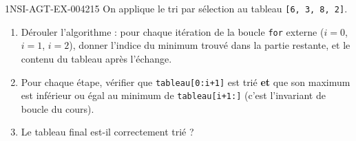 \begin{exercice}{1NSI-AGT-EX-004}{2}{15}
On applique le tri par sélection au tableau \lstinline{[6, 3, 8, 2]}.
\begin{enumerate}
  \item Dérouler l'algorithme : pour chaque itération de la boucle \lstinline{for} externe ($i=0$, $i=1$, $i=2$), donner l'indice du minimum trouvé dans la partie restante, et le contenu du tableau après l'échange.
  \item Pour chaque étape, vérifier que \lstinline{tableau[0:i+1]} est trié \textbf{et} que son maximum est inférieur ou égal au minimum de \lstinline{tableau[i+1:]} (c'est l'invariant de boucle du cours).
  \item Le tableau final est-il correctement trié ?
\end{enumerate}
\end{exercice}

